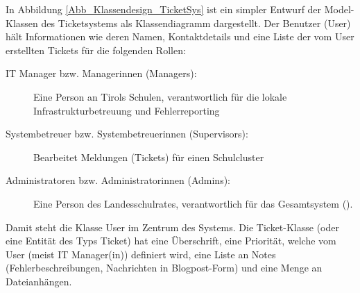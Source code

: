In Abbildung \ref{Abb_Klassendesign_TicketSys} ist ein simpler Entwurf der Model-Klassen des Ticketsystems als Klassendiagramm dargestellt. Der Benutzer (User) hält Informationen wie deren Namen, Kontaktdetails und eine Liste der vom User erstellten Tickets für die folgenden Rollen:

\begin{description}
	\item[IT Manager bzw. Managerinnen (Managers):] Eine Person an Tirols Schulen, verantwortlich für die lokale Infrastrukturbetreuung und Fehlerreporting
	\item[Systembetreuer bzw. Systembetreuerinnen (Supervisors):] Bearbeitet Meldungen (Tickets) für einen Schulcluster
	\item[Administratoren bzw. Administratorinnen (Admins):] Eine Person des Landesschulrates, verantwortlich für das Gesamtsystem (\getHammerl).
\end{description}

Damit steht die Klasse User im Zentrum des Systems. Die Ticket-Klasse (oder eine Entität des Typs Ticket) hat eine Überschrift, eine Priorität, welche vom User (meist IT Manager(in)) definiert wird, eine Liste an Notes (Fehlerbeschreibungen, Nachrichten in Blogpost-Form) und eine Menge an Dateianhängen.